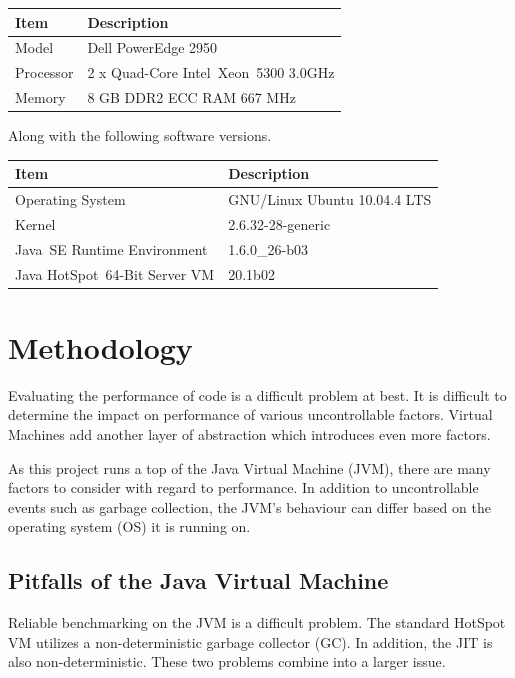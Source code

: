 \documentclass[12pt,letterpaper,oneside,notitlepage]{report}
\theoremstyle{definition}
\begin{document}
			\begin{table}[!ht]
				\centering
				\begin{tabular}{ll}
					\toprule
					Item & Description \\
					\midrule
					Model & Dell PowerEdge 2950 \\
					Processor & 2 x Quad-Core Intel\textregistered\ Xeon\texttrademark\ 5300 3.0GHz \\
					Memory & 8 GB DDR2 ECC RAM 667 MHz \\
					\bottomrule
				\end{tabular}
			\end{table}
			
			Along with the following software versions.
			
			\begin{table}[!ht]
				\centering
				\begin{tabular}{ll}
					\toprule
					Item & Description \\
					\midrule
					Operating System & GNU/Linux Ubuntu 10.04.4 LTS \\
					Kernel & 2.6.32-28-generic \\
					Java\texttrademark\ SE Runtime Environment & 1.6.0\_26-b03 \\
					Java HotSpot\texttrademark\ 64-Bit Server VM & 20.1\-b02 \\
					\bottomrule
				\end{tabular}
			\end{table}
		
		\section{Methodology}
			Evaluating the performance of code is a difficult problem at best.  It is difficult to determine the impact on performance of various uncontrollable factors.  Virtual Machines add another layer of abstraction which introduces even more factors.
			
			As this project runs a top of the Java Virtual Machine (JVM), there are many factors to consider with regard to performance.  In addition to uncontrollable events such as garbage collection, the JVM's behaviour can differ based on the operating system (OS) it is running on.
			
			\subsection{Pitfalls of the Java Virtual Machine}
				Reliable benchmarking on the JVM is a difficult problem.  The standard HotSpot VM utilizes a non-deterministic garbage collector (GC).  In addition, the JIT is also non-deterministic.  These two problems combine into a larger issue.
				
\end{document}
